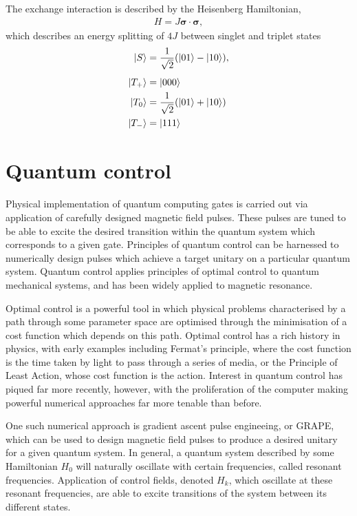 \documentclass[../Thesis.tex]{subfiles}
\begin{document}
The exchange interaction is described by the Heisenberg Hamiltonian,
\begin{align} 
H = J\bm{\sigma}\cdot\bm{\sigma},
\end{align}
which describes an energy splitting of $4J$ between singlet and triplet states 
\begin{align}
    \ket{S} &= \frac{1}{\sqrt{2}}(\ket{01}-\ket{10}),\\[4pt]
    \ket{T_+}&=\ket{000}\\
    \ket{T_0} &= \frac{1}{\sqrt{2}}(\ket{01}+\ket{10})\\
    \ket{T_-} &= \ket{111}
\end{align}



\section{Quantum control}
Physical implementation of quantum computing gates is carried out via application of carefully designed magnetic field pulses. These pulses are tuned to be able to excite the desired transition within the quantum system which corresponds to a given gate. Principles of quantum control can be harnessed to numerically design pulses which achieve a target unitary on a particular quantum system. Quantum control applies principles of optimal control to quantum mechanical systems, and has been widely applied to magnetic resonance\cite{conolly_optimal_1986}.

Optimal control is a powerful tool in which physical problems characterised by a path through some parameter space are optimised through the minimisation of a cost function which depends on this path. Optimal control has a rich history in physics, with early examples including Fermat's principle, where the cost function is the time taken by light to pass through a series of media, or the Principle of Least Action, whose cost function is the action\cite{sargent_optimal_2000}. Interest in quantum control has piqued far more recently, however, with the proliferation of the computer making powerful numerical approaches far more tenable than before. 



One such numerical approach is gradient ascent pulse engineeing, or GRAPE, which can be used to design magnetic field pulses to produce a desired unitary for a given quantum system\cite{khaneja_optimal_2005,rowland_implementing_2012}. In general, a quantum system described by some Hamiltonian $H_0$ will naturally oscillate with certain frequencies, called resonant frequencies. Application of control fields, denoted $H_k$, which oscillate at these resonant frequencies, are able to excite transitions of the system between its different states. 
\end{document}
